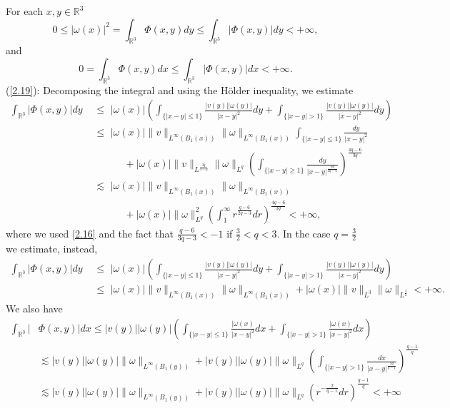 \documentclass[12pt]{article}
\numberwithin{equation}{section}
\theoremstyle{definition}
\begin{document}
 For each $x,y \in \mathbb{R}^3$
\begin{equation}\label{2.17}
0\leq |{\omega}(x)|^2 = \int_{\mathbb{R}^3} \Phi(x,y) dy \leq \int_{\mathbb{R}^3} |\Phi(x,y)|dy < +\infty,
\end{equation}
and
\begin{equation}\label{2.18}
0= \int_{\mathbb{R}^3} \Phi(x,y) dx \leq \int_{\mathbb{R}^3} |\Phi(x,y)|dx < +\infty.
\end{equation}
(\ref{2.19}):  Decomposing the integral and using the H\"{o}lder inequality, we estimate
\begin{align}\label{2.20}
\int_{\mathbb{R}^3}|\Phi(x,y)|dy\,\,&\leq\,\,|{\omega}(x)|\left(\int_{\{|x-y|\leq1 \}}\frac{|v(y)||{\omega}(y)|}{|x-y|^2}dy
    +\int_{\{|x-y|>1 \}}\frac{|v(y)||{\omega}(y)|}{|x-y|^2}dy \right)\nonumber \\
    &\leq\,\,|{\omega}(x)|\|v\|_{L^{\infty}(B_1(x))}\|{\omega}\|_{L^{\infty}(B_1(x))}\int_{\{|x-y|\leq1 \}}\frac{dy}{|x-y|^2}\nonumber\\
     &\qquad \quad +|{\omega}(x)|\|v\|_{L^{\frac{3q}{3-q}}}\|{\omega}\|_{L^q}\left(\int_{\{|x-y|\geq1 \}}\frac{dy}{|x-y|^{\frac{6q}{4q-6}}}\right)^{\frac{4q-6}{3q}}\nonumber\\
 & \lesssim \,\,|{\omega}(x)|\|v\|_{L^{\infty}(B_1(x))}\|{\omega}\|_{L^{\infty}(B_1(x))}\nonumber\\
     &\qquad\quad +|{\omega}(x)|\|{\omega}\|^2_{L^q}\left(\int_{1}^{\infty}r^{\frac{q-6}{2q-3}}dr\right)^{\frac{4q-6}{3q}} <+\infty,
    \end{align}
 where we used \eqref{2.16} and the fact that $\frac{q-6}{3q-3}<-1$ if $\frac{3}{2}<q<3$. In the case $q=\frac{3}{2}$ we estimate, instead,
\begin{align}\label{2.21}
\int_{\mathbb{R}^3}|\Phi(x,y)|dy\,\,&\leq\,\,|{\omega}(x)|\left(\int_{\{|x-y|\leq1 \}}\frac{|v(y)||{\omega}(y)|}{|x-y|^2}dy
    +\int_{\{|x-y|>1 \}}\frac{|v(y)||{\omega}(y)|}{|x-y|^2}dy \right)\nonumber \\
    &\leq\,\,|{\omega}(x)|\|v\|_{L^{\infty}(B_1(x))}\|{\omega}\|_{L^{\infty}(B_1(x))}+|{\omega}(x)|\|v\|_{L^3}\|{\omega}\|_{L^{\frac{3}{2}}}<+\infty.
\end{align}
We also have
\begin{align}\label{2.22}
\int_{\mathbb{R}^3}|&\Phi(x,y)|dx \leq |v(y)||{\omega}(y)|\left(\int_{\{|x-y|\leq1\}}\frac{|{\omega}(x)}{|x-y|^2}dx
       +\int_{\{|x-y|>1\}}\frac{|{\omega}(x)}{|x-y|^2}dx\right)\nonumber\\
 & \lesssim |v(y)||{\omega}(y)|\|{\omega}\|_{L^{\infty}(B_1(y))} + |v(y)||{\omega}(y)|\|{\omega}\|_{L^q}\left(\int_{\{|x-y|>1\}}\frac{dx}{|x-y|^{\frac{2q}{q-1}}}\right)^{\frac{q-1}{q}}\nonumber\\
 & \lesssim |v(y)||{\omega}(y)|\|{\omega}\|_{L^{\infty}(B_1(y))}
  + |v(y)||{\omega}(y)|\|{\omega}\|_{L^q}\left(r^{-\frac{2}{q-1}}dr\right)^{\frac{q-1}{q}}<+\infty
\end{align}
\end{document}
